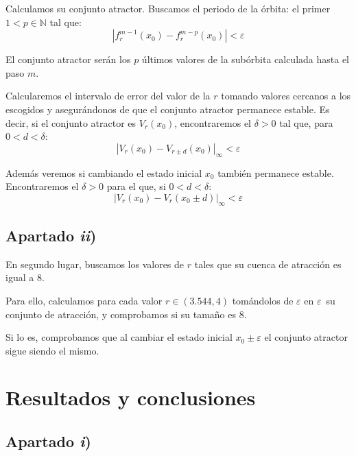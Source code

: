 \documentclass[a4paper]{article}
\begin{document}
	Calculamos su conjunto atractor. Buscamos el periodo de la órbita: el primer $1<p\in\mathbb{N}$ tal que:	
	\[ \left|f_r^{m-1}(x_0) - f_r^{m-p}(x_0)\right| < \varepsilon \]
	
	El conjunto atractor serán los $p$ últimos valores de la subórbita calculada hasta el paso $m$.
	
	Calcularemos el intervalo de error del valor de la $r$ tomando valores cercanos a los escogidos y asegurándonos de que el conjunto atractor permanece estable. Es decir, si el conjunto atractor es $V_r(x_0)$, encontraremos el $\delta>0$ tal que, para $0<d<\delta$:
	\[ \left| V_r(x_0) - V_{r\pm d}(x_0) \right|_\infty < \varepsilon \]
	
	Además veremos si cambiando el estado inicial $x_0$ también permanece estable. Encontraremos el $\delta>0$ para el que, si $0<d<\delta$:
	\[ \left| V_r(x_0) - V_r(x_0\pm d) \right|_\infty < \varepsilon \]
	
	\subsection{Apartado \textit{ii})}
		
	En segundo lugar, buscamos los valores de $r$ tales que su cuenca de atracción es igual a 8.
	
	Para ello, calculamos para cada valor $r\in(3.544,4)$ \textemdash tomándolos de $\varepsilon$ en $\varepsilon$\textemdash~su conjunto de atracción, y comprobamos si su tamaño es 8. 
	
	Si lo es, comprobamos que al cambiar el estado inicial $x_0\pm\varepsilon$ el conjunto atractor sigue siendo el mismo.
	
	
	
	
	\section{Resultados y conclusiones}
	\subsection{Apartado \textit{i})}
	
\end{document}
